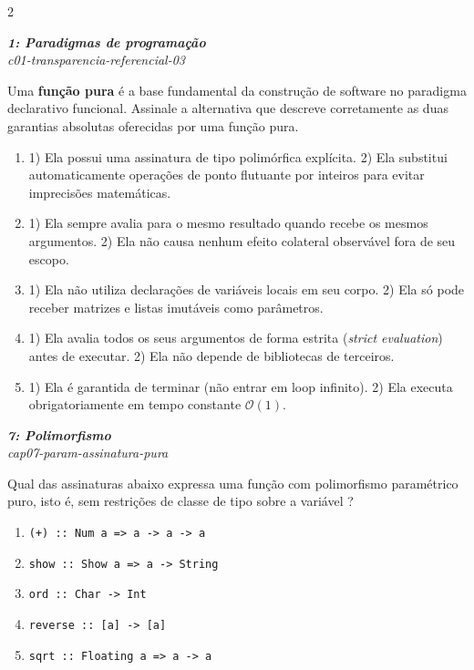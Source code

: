 \documentclass[a4paper,10pt,brazil]{article}
\begin{document}
\begin{multicols}{2}
\begin{flushright}
  \footnotesize
  \textit{\textbf{1: Paradigmas de programação}}\\
  \textit{c01-transparencia-referencial-03}\\

\end{flushright}
Uma \textbf{função pura} é a base fundamental da construção de software no paradigma declarativo funcional. Assinale a alternativa que descreve corretamente as duas garantias absolutas oferecidas por uma função pura.

\begin{enumerate}
  \item 1) Ela possui uma assinatura de tipo polimórfica explícita. 2) Ela substitui automaticamente operações de ponto flutuante por inteiros para evitar imprecisões matemáticas.

  \item 1) Ela sempre avalia para o mesmo resultado quando recebe os mesmos argumentos. 2) Ela não causa nenhum efeito colateral observável fora de seu escopo.

  \item 1) Ela não utiliza declarações de variáveis locais em seu corpo. 2) Ela só pode receber matrizes e listas imutáveis como parâmetros.

  \item 1) Ela avalia todos os seus argumentos de forma estrita (\emph{strict evaluation}) antes de executar. 2) Ela não depende de bibliotecas de terceiros.

  \item 1) Ela é garantida de terminar (não entrar em loop infinito). 2) Ela executa obrigatoriamente em tempo constante $\mathcal{O}(1)$.


\end{enumerate}

\begin{flushright}
  \footnotesize
  \textit{\textbf{7: Polimorfismo}}\\
  \textit{cap07-param-assinatura-pura}\\

\end{flushright}
Qual das assinaturas abaixo expressa uma função com polimorfismo paramétrico puro, isto é, sem restrições de classe de tipo sobre a variável ?
\begin{enumerate}
  \item \texttt{(+) :: Num a => a -> a -> a}
  \item \texttt{show :: Show a => a -> String}
  \item \texttt{ord :: Char -> Int}
  \item \texttt{reverse :: [a] -> [a]}
  \item \texttt{sqrt :: Floating a => a -> a}


\end{enumerate}
\end{multicols}
\end{document}
